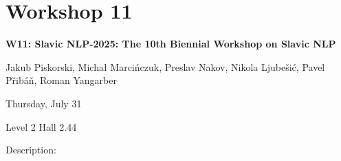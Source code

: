 \clearpage



\section[W11: Slavic NLP-2025: The 10th Biennial Workshop on Slavic NLP]{Workshop 11}

\begin{center}
    {\Large \textbf{W11: Slavic NLP-2025: The 10th Biennial Workshop on Slavic NLP}}

   Jakub Piskorski, Michał Marcińczuk, Preslav Nakov, Nikola Ljubešić, Pavel Přibáň, Roman Yangarber

    Thursday, July 31
    
   Level 2 Hall 2.44

\end{center}

Description:

